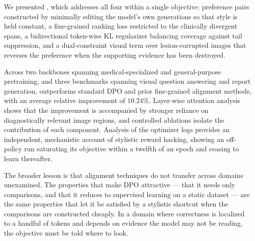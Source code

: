 We presented \ourloss{}, which addresses all four within a single objective: preference pairs constructed by minimally editing the model's own generations so that style is held constant, a fine-grained ranking loss restricted to the clinically divergent spans, a bidirectional token-wise KL regularizer balancing coverage against tail suppression, and a dual-constraint visual term over lesion-corrupted images that reverses the preference when the supporting evidence has been destroyed.

Across two backbones spanning medical-specialized and general-purpose pretraining, and three benchmarks spanning visual question answering and report generation, \ourloss{} outperforms standard DPO and prior fine-grained alignment methods, with an average relative improvement of $10.24\%$. Layer-wise attention analysis shows that the improvement is accompanied by stronger reliance on diagnostically relevant image regions, and controlled ablations isolate the contribution of each component. Analysis of the optimizer logs provides an independent, mechanistic account of stylistic reward hacking, showing an off-policy run saturating its objective within a twelfth of an epoch and ceasing to learn thereafter.

The broader lesson is that alignment techniques do not transfer across domains unexamined. The properties that make DPO attractive --- that it needs only comparisons, and that it reduces to supervised learning on a static dataset --- are the same properties that let it be satisfied by a stylistic shortcut when the comparisons are constructed cheaply. In a domain where correctness is localized to a handful of tokens and depends on evidence the model may not be reading, the objective must be told where to look.

